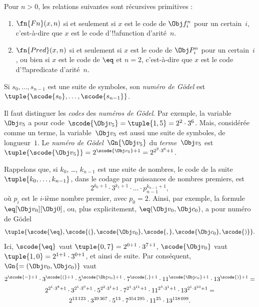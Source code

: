 \documentclass[../../../include/open-logic-section]{subfiles}
\begin{document}
\begin{prop}
Pour $n>0$, les relations suivantes sont récursives primitives :
\begin{enumerate}
\item $\fn{Fn}(x, n)$ si et seulement si $x$ est le code de
  $\Obj f^n_i$ pour un certain~$i$, c'est-à-dire que $x$ est le code
  d'!!a{function} d'arité~$n$.
\item $\fn{Pred}(x, n)$ si et seulement si $x$ est le code de
  $\Obj P^n_i$ pour un certain~$i$, ou bien si $x$ est le code de $\eq$
  et $n = 2$, c'est-à-dire que $x$ est le code d'!!a{predicate}
  d'arité~$n$.
\end{enumerate}
\end{prop}

\begin{defn}
Si $s_0, \dots, s_{n-1}$ est une suite de symboles, son
\emph{numéro de G\"odel} est
$\tuple{\scode{s_0}, \dots, \scode{s_{n-1}}}$.
\end{defn}

\begin{explain}
Il faut distinguer les \emph{codes} des \emph{numéros de G\"odel}.
Par exemple, la variable~$\Obj v_5$ a pour code~$\scode{\Obj
  v_5} = \tuple{1, 5} = 2^2\cdot 3^6$. Mais, considérée comme un
terme, la variable~$\Obj v_5$ est aussi une suite de symboles, de
longueur~$1$. Le \emph{numéro de G\"odel}~$\Gn{\Obj v_5}$ du
\emph{terme}~$\Obj v_5$ est $\tuple{\scode{\Obj v_5}} = 2^{\scode{\Obj
    v_5} + 1} = 2^{2^2\cdot 3^6 + 1}$.
\end{explain}

\begin{ex}
Rappelons que, si $k_0$, \dots, $k_{n-1}$ est une suite de nombres,
le code de la suite $\tuple{k_0, \dots, k_{n-1}}$, dans le codage
par puissances de nombres premiers, est
\[
2^{k_0+1}\cdot3^{k_1+1}\cdot \dots \cdot p_{n-1}^{k_{n-1}+1},
\]
où $p_i$ est le $i$-ième nombre premier, avec $p_0 = 2$. Ainsi, par
exemple, la formule $\eq[\Obj v_0][\Obj 0]$, ou, plus explicitement,
${\eq}(\Obj v_0,\Obj c_0)$, a pour numéro de G\"odel
\[
\tuple{\scode{\eq},\scode{(},\scode{\Obj v_0},\scode{,}, \scode{\Obj
    c_0},\scode{)}}.
\]
Ici, $\scode{\eq}$ vaut $\tuple{0,7} = 2^{0+1}\cdot
3^{7+1}$, $\scode{\Obj v_0}$ vaut $\tuple{1,0} = 2^{1+1}\cdot3^{0+1}$,
et ainsi de suite. Par conséquent, $\Gn{=(\Obj v_0,\Obj c_0)}$ vaut
\begin{multline*}
2^{\scode{=} + 1}\cdot 3^{\scode{(}+1}\cdot 5^{\scode{\Obj v_0}+1}
\cdot 7^{\scode{,} + 1} \cdot 11^{\scode{\Obj c_0}+1} \cdot
13^{\scode{)}+1} = \\
2^{2^1\cdot 3^8 + 1}\cdot 3^{2^1\cdot 3^9+1}\cdot 5^{2^2\cdot 3^1+1}
\cdot 7^{2^1\cdot 3^{11} + 1} \cdot 11^{2^3\cdot3^1+1} \cdot
13^{2^1\cdot3^{10}+1} = \\
2^{13\,123}\cdot 3^{39\,367}\cdot 5^{13}\cdot 7^{354\,295}\cdot11^{25}\cdot13^{118\,099}.
\end{multline*}
\end{ex}
\end{document}
